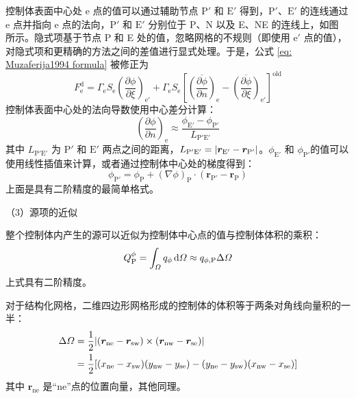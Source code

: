控制体表面中心处 e 点的值可以通过辅助节点 $\mathrm{P}'$ 和 $\mathrm{E}'$ 得到，$\mathrm{P}'$、$\mathrm{E}'$ 的连线通过 e 点并指向 e 点的法向，$\mathrm{P}'$ 和 $\mathrm{E}'$ 分别位于 P、N 以及 E、NE 的连线上，如图~ 所示。隐式项基于节点 P 和 E 处的值，忽略网格的不规则（即使用 $\mathrm{e}'$ 点的值），对隐式项和更精确的方法之间的差值进行显式处理。于是，公式 \eqref{eq: Muzaferija1994 formula} 被修正为
\begin{equation}
	F_{\mathrm{e}}^{\mathrm{d}} = \varGamma_{\mathrm{e}}S_{\mathrm{e}}\left(\frac{\partial\phi}{\partial\xi}\right)_{\mathrm{e'}} +
	\varGamma_{\mathrm{e}}S_{\mathrm{e}}\left[ 
	\overline{\left(\frac{\partial\phi}{\partial n}\right)}_{\mathrm{e}} - 
	\overline{\left(\frac{\partial\phi}{\partial\xi}\right)}_{\mathrm{e'}} \right]^{\mathrm{old}}
\end{equation}
控制体表面中心处的法向导数使用中心差分计算：
\begin{equation}
	\left(\frac{\partial\phi}{\partial n}\right)_{\mathrm{e}} \approx
	\frac{\phi_{\mathrm{E'}}-\phi_{\mathrm{P'}}}{L_{\mathrm{P'E'}}}
\end{equation}
其中 $L_{\mathrm{P'E'}}$ 为 $\mathrm{P}'$ 和 $\mathrm{E}'$ 两点之间的距离，$L_{\mathrm{P'E'}} = \lvert\bm{r}_{\mathrm{E'}}-\bm{r}_{\mathrm{P'}}\vert$。$\phi_{\mathrm{E'}}$ 和 $\phi_{\mathrm{P'}}$的值可以使用线性插值来计算，或者通过控制体中心处的梯度得到：
\begin{equation}
	\phi_{\mathrm{P'}} = \phi_{\mathrm{P}} + (\nabla\phi)_{\mathrm{P}}\cdot(\bm{r}_{\mathrm{P'}}-\bm{r}_{\mathrm{P}})
\end{equation}
上面是具有二阶精度的最简单格式。

（3）源项的近似

整个控制体内产生的源可以近似为控制体中心点的值与控制体体积的乘积：
\begin{equation}
	Q_{\mathrm{P}}^{\phi} = \int_{\varOmega}q_{\phi}\,\mathrm{d}\varOmega \approx
	q_{\phi,\mathrm{P}}\Delta\varOmega
\end{equation}
上式具有二阶精度。

对于结构化网格，二维四边形网格形成的控制体的体积等于两条对角线向量积的一半：
\begin{equation}
\begin{split}
	\Delta\varOmega &= \frac12\lvert(\bm{r}_{\mathrm{ne}}-\bm{r}_{\mathrm{sw}})\times (\bm{r}_{\mathrm{nw}}-\bm{r}_{\mathrm{se}})\vert \\
	&=\frac12[(x_{\mathrm{ne}}-x_{\mathrm{sw}})(y_{\mathrm{nw}}-y_{\mathrm{se}}) - (y_{\mathrm{ne}}-y_{\mathrm{sw}})(x_{\mathrm{nw}}-x_{\mathrm{se}})]
\end{split}
\end{equation}
其中 $\bm{r}_{\mathrm{ne}}$ 是“ne”点的位置向量，其他同理。

